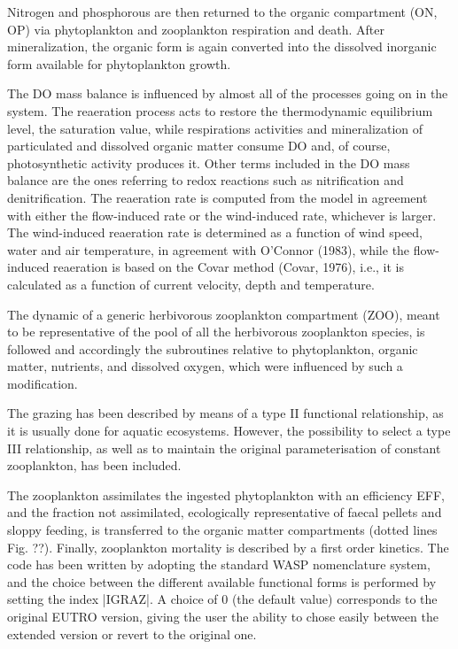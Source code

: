Nitrogen and phosphorous are then returned to the organic compartment 
(ON, OP) via phytoplankton and zooplankton respiration and death. 
After mineralization, the organic form is again converted into
the dissolved inorganic form available for phytoplankton growth. 

The DO mass balance is influenced by almost all of the processes 
going on in the system. The reaeration process acts to restore 
the thermodynamic equilibrium level, the saturation value, while 
respirations activities and mineralization of particulated and 
dissolved organic matter consume DO and, of course, photosynthetic 
activity produces it. Other terms included in the DO mass balance 
are the ones referring to redox reactions such as nitrification 
and denitrification. The reaeration rate is computed from the 
model in agreement with either the flow-induced rate or the wind-induced 
rate, whichever is larger. The wind-induced reaeration rate is 
determined as a function of wind speed, water and air temperature, 
in agreement with O'Connor (1983), while the flow-induced reaeration 
is based on the Covar method (Covar, 1976), i.e., it is calculated 
as a function of current velocity, depth and temperature.

The dynamic of a generic herbivorous zooplankton compartment 
(ZOO), meant to be representative of the pool of all the herbivorous 
zooplankton species, is followed and accordingly the subroutines 
relative to phytoplankton, organic matter, nutrients, and dissolved 
oxygen, which were influenced by such a modification. 

The grazing has been described by means of a type II functional 
relationship, as it is usually done for aquatic ecosystems. However, 
the possibility to select a type III relationship, as well as 
to maintain the original parameterisation of constant zooplankton, 
has been included.  

The zooplankton assimilates the ingested phytoplankton with an 
efficiency EFF, and the fraction not assimilated, ecologically 
representative of faecal pellets and sloppy feeding, is transferred 
to the organic matter compartments (dotted lines Fig. ??). Finally, 
zooplankton mortality is described by a first order kinetics. 
The code has been written by adopting the standard WASP nomenclature 
system, and the choice between the different available functional 
forms is performed by setting the index |IGRAZ|. A choice of 0 
(the default value) corresponds to the original EUTRO version, 
giving the user the ability to chose easily between the extended 
version or revert to the original one.


